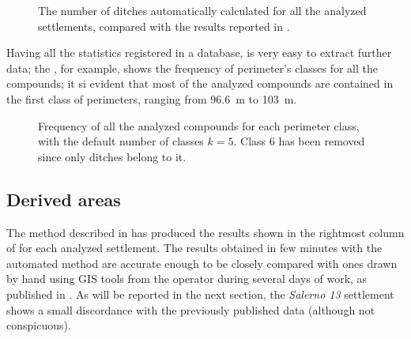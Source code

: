             \begin{figure}[H]
                \centering
                \begin{tikzpicture}
                    
                \end{tikzpicture}
                \caption[The number of ditches in \cite{laterza} compared to the results of the proposed method.]{The number of ditches automatically calculated for all the analyzed settlements, compared with the results reported in \cite{laterza}.}
                \label{fig:graph-num-ditch}
            \end{figure}

            Having all the statistics registered in a database, is very easy to extract further data; the , for example, shows the frequency of perimeter's classes for all the compounds; it si evident that most of the analyzed compounds are contained in the first class of perimeters, ranging from \SI{96.6}{\meter} to \SI{103}{\meter}.

            \begin{figure}
                \caption[Frequency of all the analyzed compounds for each perimeter class, with $k=5$.]{Frequency of all the analyzed compounds for each perimeter class, with the default number of classes $k=5$. Class $6$ has been removed since only ditches belong to it.}
                \begin{tikzpicture}
                    
                \end{tikzpicture}
                \label{fig:graph-perim-class}
            \end{figure}

        \subsection{Derived areas}

            The method described in  has produced the results shown in the rightmost column of  for each analyzed settlement. The results obtained in few minutes with the automated method are accurate enough to be closely compared with ones drawn by hand using GIS tools from the operator during several days of work, as published in \cite{laterza}.
            As will be reported in the next section, the \emph{Salerno 13} settlement shows a small discordance with the previously published data (although not conspicuous).

